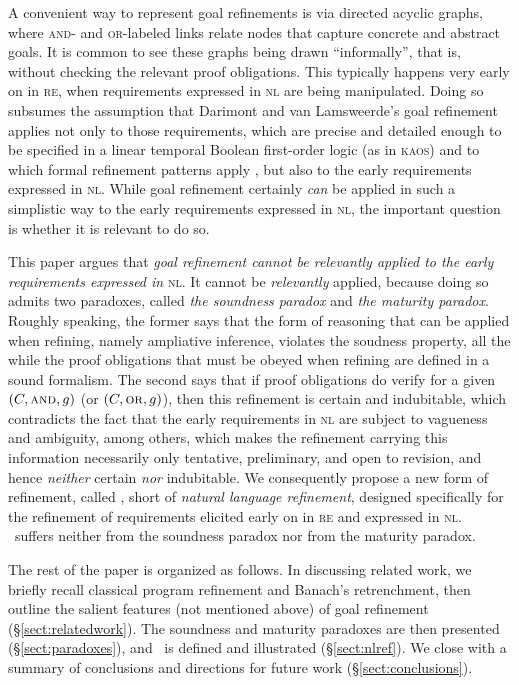 \documentclass[10pt, conference, compsocconf]{IEEEtran}
\begin{document}
A convenient way to represent goal refinements is via directed acyclic graphs, where \textsc{and}- and \textsc{or}-labeled links relate nodes that capture concrete and abstract goals. It is common to see these graphs being drawn ``informally'', that is, without checking the relevant proof obligations. This typically happens very early on in \textsc{re}, when requirements expressed in \textsc{nl} are being manipulated. Doing so subsumes the assumption that Darimont and van Lamsweerde's goal refinement applies not only to those requirements, which are precise and detailed enough to be specified in a linear temporal Boolean first-order logic (as in \textsc{kaos}) and to which formal refinement patterns apply \cite{Darimont+:1996:FSE}, but also to the early requirements expressed in \textsc{nl}. While goal refinement certainly \textit{can} be applied in such a simplistic way to the early requirements expressed in \textsc{nl}, the important question is whether it is relevant to do so.

This paper argues that \textit{goal refinement cannot be relevantly applied to the early requirements expressed in} \textsc{nl}. It cannot be \textit{relevantly} applied, because doing so admits two paradoxes, called \textit{the soundness paradox} and \textit{the maturity paradox}. Roughly speaking, the former says that the form of reasoning that can be applied when refining, namely ampliative inference, violates the soudness property, all the while the proof obligations that must be obeyed when refining are defined in a sound formalism. The second says that if proof obligations do verify for a given $(C, \textsc{and}, g)$ (or $(C, \textsc{or}, g)$), then this refinement is certain and indubitable, which contradicts the fact that the early requirements in \textsc{nl} are subject to vagueness and ambiguity, among others, which makes the refinement carrying this information necessarily only tentative, preliminary, and open to revision, and hence \textit{neither} certain \textit{nor} indubitable. We consequently propose a new form of refinement, called \nlref, short of \textit{natural language refinement}, designed specifically for the refinement of requirements elicited early on in \textsc{re} and expressed in \textsc{nl}. \nlref\ suffers neither from the soundness paradox nor from the maturity paradox. 

The rest of the paper is organized as follows. In discussing related work, we briefly recall classical program refinement and Banach's retrenchment, then outline the salient features (not mentioned above) of goal refinement (\S\ref{sect:relatedwork}). The soundness and maturity paradoxes are then presented (\S\ref{sect:paradoxes}), and \nlref\ is defined and illustrated (\S\ref{sect:nlref}). We close with a summary of conclusions and directions for future work (\S\ref{sect:conclusions}). 
\end{document}
